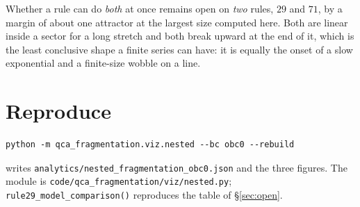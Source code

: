 \documentclass[11pt]{article}
\newcommand{\fn}[1]{\texttt{#1}}
\begin{document}
Whether a rule can do \emph{both} at once remains open on \emph{two} rules, $29$
and $71$, by a margin of about one attractor at the largest size computed here.
Both are linear inside a sector for a long stretch and both break upward at the
end of it, which is the least conclusive shape a finite series can have: it is
equally the onset of a slow exponential and a finite-size wobble on a line.

\section*{Reproduce}

\begin{verbatim}
python -m qca_fragmentation.viz.nested --bc obc0 --rebuild
\end{verbatim}

\noindent writes \fn{analytics/nested\_fragmentation\_obc0.json} and the three
figures. The module is \fn{code/qca\_fragmentation/viz/nested.py};
\fn{rule29\_model\_comparison()} reproduces the table of \S\ref{sec:open}.
\end{document}
